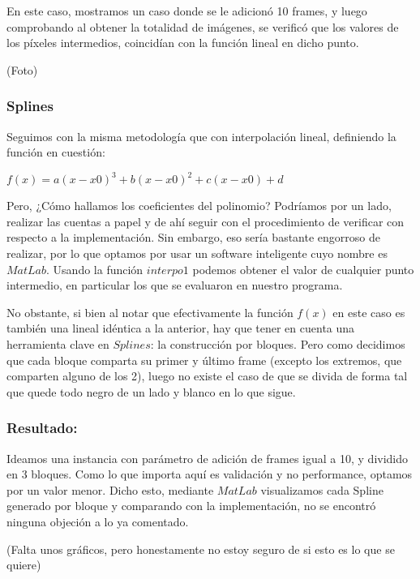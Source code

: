En este caso, mostramos un caso donde se le adicion\'o 10 frames, y luego comprobando al obtener la totalidad de im\'agenes, se verific\'o que los valores de los p\'ixeles intermedios, coincid\'ian con la funci\'on lineal en dicho punto.

(Foto)

\subsubsection*{Splines}

Seguimos con la misma metodolog\'ia que con interpolaci\'on lineal, definiendo la funci\'on en cuesti\'on:

$f(x) = a (x - x0)^3 + b ( x - x0)^2 + c ( x - x0) + d$

Pero, ¿C\'omo hallamos los coeficientes del polinomio? Podr\'iamos por un lado, realizar las cuentas a papel y  de ah\'i seguir con el procedimiento de verificar con respecto a la implementaci\'on. Sin embargo, eso ser\'ia  bastante engorroso de realizar, por lo que optamos por usar un software inteligente cuyo nombre es $MatLab$. Usando la funci\'on $interpo1$ podemos obtener el valor de cualquier punto intermedio, en particular los que se evaluaron en nuestro programa.

No obstante, si bien al notar que efectivamente la funci\'on $f(x)$ en este caso es tambi\'en una lineal id\'entica a la anterior, hay que tener en cuenta una herramienta clave en $Splines$: la construcci\'on por bloques. Pero como decidimos que cada bloque comparta su primer y \'ultimo frame (excepto los extremos, que comparten alguno de los 2), luego no existe el caso de que se divida de forma tal que quede todo negro de un lado y blanco en lo que sigue.

\subsubsection*{\bf{Resultado:}}

Ideamos una instancia con par\'ametro de adici\'on de frames igual a 10, y dividido en 3 bloques. Como lo que importa aqu\'i es validaci\'on y no performance, optamos por un valor menor. Dicho esto, mediante $MatLab$ visualizamos cada Spline generado por bloque y comparando con la implementaci\'on, no se encontr\'o ninguna objeci\'on a lo ya comentado.

(Falta unos gr\'aficos, pero honestamente no estoy seguro de si esto es lo que se quiere)

